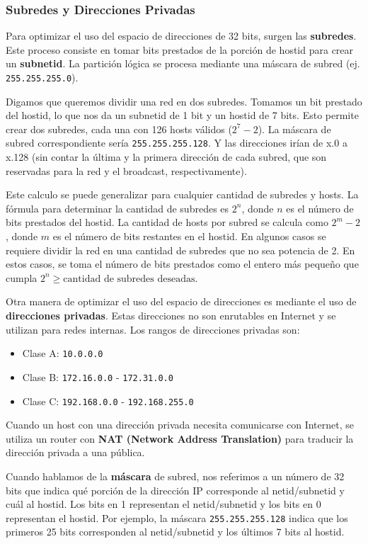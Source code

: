 \subsubsection{Subredes y Direcciones Privadas}
Para optimizar el uso del espacio de direcciones de 32 bits, surgen las \textbf{subredes}. Este proceso consiste en tomar bits prestados de la porción de hostid para crear un \textbf{subnetid}. La partición lógica se procesa mediante una máscara de subred (ej. \texttt{255.255.255.0}). 

Digamos que queremos dividir una red en dos subredes. Tomamos un bit prestado del hostid, lo que nos da un subnetid de 1 bit y un hostid de 7 bits. Esto permite crear dos subredes, cada una con 126 hosts válidos ($2^7 - 2$). La máscara de subred correspondiente sería \texttt{255.255.255.128}. Y las direcciones irían de x.0 a x.128 (sin contar la última y la primera dirección de cada subred, que son reservadas para la red y el broadcast, respectivamente).

Este calculo se puede generalizar para cualquier cantidad de subredes y hosts. La fórmula para determinar la cantidad de subredes es $2^n$, donde $n$ es el número de bits prestados del hostid. La cantidad de hosts por subred se calcula como $2^m - 2$, donde $m$ es el número de bits restantes en el hostid. En algunos casos se requiere dividir la red en una cantidad de subredes que no sea potencia de 2. En estos casos, se toma el número de bits prestados como el entero más pequeño que cumpla $2^n \geq \text{cantidad de subredes deseadas}$.

Otra manera de optimizar el uso del espacio de direcciones es mediante el uso de \textbf{direcciones privadas}. Estas direcciones no son enrutables en Internet y se utilizan para redes internas. Los rangos de direcciones privadas son:
\begin{itemize}
    \item Clase A: \texttt{10.0.0.0}
    \item Clase B: \texttt{172.16.0.0} - \texttt{172.31.0.0}
    \item Clase C: \texttt{192.168.0.0} - \texttt{192.168.255.0}
\end{itemize}
Cuando un host con una dirección privada necesita comunicarse con Internet, se utiliza un router con \textbf{NAT (Network Address Translation)} para traducir la dirección privada a una pública.

\begin{obs}
  Cuando hablamos de la \textbf{máscara} de subred, nos referimos a un número de 32 bits que indica qué porción de la dirección IP corresponde al netid/subnetid y cuál al hostid. Los bits en 1 representan el netid/subnetid y los bits en 0 representan el hostid. Por ejemplo, la máscara \texttt{255.255.255.128} indica que los primeros 25 bits corresponden al netid/subnetid y los últimos 7 bits al hostid.
\end{obs}


